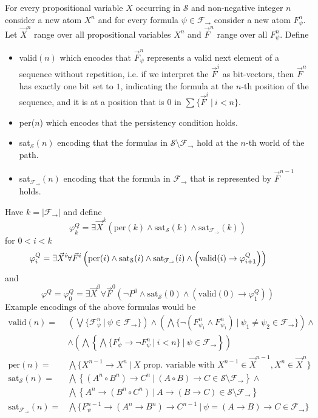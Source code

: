 \documentclass[a4paper,UKenglish,cleveref, autoref, thm-restate]{lipics-v2021}
\begin{document}
\begin{definition}
	For every propositional variable $X$ occurring in $\mathcal S$ and non-negative integer $n$ consider a new atom $X^n$ and for every formula $\psi\in\mathcal F_\to$ consider a new atom $F_\psi^n$. Let $\vec X^n$ range over all propositional variables $X^n$ and $\vec F^n$ range over all $F_\psi^n$. Define
	\begin{itemize}
		\item valid$(n)$ which encodes that $\vec F^n_\psi$ represents a valid next element of a sequence without repetition, i.e. if we interpret the $\vec F^i$ as bit-vectors, then $\vec F^n$ has exactly one bit set to $1$, indicating the formula at the $n$-th position of the sequence, and it is at a position that is $0$ in $\sum\{\vec F^i\:|\:i < n\}$.
		\item per($n$) which encodes that the persistency condition holds.
		\item sat$_{\mathcal S}(n)$ encoding that the formulas in $\mathcal S\setminus\mathcal F_\to$ hold at the $n$-th world of the path.
		\item sat$_{\mathcal F_\to}(n)$ encoding that the formula in $\mathcal F_\to$ that is represented by $\vec F^{n-1}$ holds.
	\end{itemize}
	Have $k = |\mathcal F_\to|$ and define
	$$\varphi^Q_{k} = \exists \vec X^k\left(\text{per}(k)\wedge \text{sat}_{\mathcal S}(k)\wedge \text{sat}_{\mathcal F_\to}(k)\right)$$
	for $0 < i < k$
	$$\hspace*{-.8cm}\varphi^Q_{i} = \exists \vec X^i\forall \vec F^i\left(\text{per}(i)\wedge \text{sat}_{\mathcal S}(i)\wedge \text{sat}_{\mathcal F_\to}(i)\wedge\left(\text{valid}(i)\to \varphi^Q_{i+1}\right)\right)$$
	and $$\varphi^Q = \varphi_0^Q = \exists \vec X^0\forall \vec F^0\left(\neg P^0\wedge \text{sat}_{\mathcal S}(0)\wedge(\text{valid}(0)\to \varphi_1^Q)\right)$$
	Example encodings of the above formulas would be
	\begin{align*}
		\text{valid}(n) = &\left(\bigvee \{\mathcal F^n_\psi\:|\:\psi\in\mathcal F_\to\}\right)\wedge\left(\bigwedge \{\neg(F^n_{\psi_1}\wedge F^n_{\psi_1})\:|\:\psi_1\neq\psi_2\in\mathcal F_\to\}\right)\wedge\\&\wedge\left(\bigwedge\left\{\bigwedge\{F^i_\psi\to\neg F^n_\psi\:|\:i < n\}\:|\:\psi\in\mathcal F_\to\right\}\right)\\
		\text{per}(n) = & \bigwedge\{X^{n-1}\to X^n\:|\: X \text{ prop. variable with }X^{n-1}\in\vec X^{n-1}, X^n \in\vec X^{n}\}\\
		\text{sat}_{\mathcal S}(n) = &\bigwedge\left\{(A^n\circ B^n)\to C^n\:|\:(A\circ B)\to C\in \mathcal S\setminus\mathcal F_\to\right\}\wedge\\
		&\bigwedge\left\{A^n\to (B^n\circ C^n)\:|\:A\to (B\to C)\in \mathcal S\setminus\mathcal F_\to\right\}\\
		\text{sat}_{\mathcal F_\to}(n) = & \bigwedge\{F^{n-1}_\psi\to (A^n\to B^n)\to C^{n-1}\:|\:\psi = (A\to B)\to C\in\mathcal F_\to\}
	\end{align*}
\end{definition}
\end{document}
